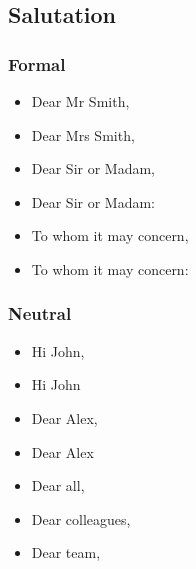 \subsection{Salutation}

\subsubsection{Formal}
\begin{itemize}
\item Dear Mr Smith,
\item Dear Mrs Smith,
\item Dear Sir or Madam,
\item Dear Sir or Madam:
\item To whom it may concern,
\item To whom it may concern:
\end{itemize}

\subsubsection{Neutral}
\begin{itemize}
\item Hi John,
\item Hi John
\item Dear Alex,
\item Dear Alex
\item Dear all,
\item Dear colleagues,
\item Dear team,
\end{itemize}